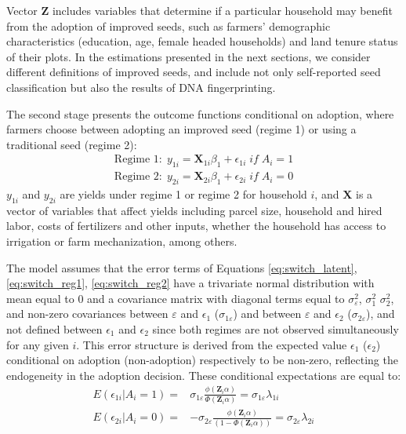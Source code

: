 \documentclass[11pt]{article}
\begin{document}
Vector $\bm{Z}$ includes variables that determine if a particular household may benefit from the adoption of improved seeds, such as farmers' demographic characteristics (education, age, female headed households) and land tenure status of their plots. In the estimations presented in the next sections, we consider different definitions of improved seeds, and include not only self-reported seed classification but also the results of DNA fingerprinting.  \par
The second stage presents the outcome functions conditional on adoption, where farmers choose between adopting an improved seed (regime 1) or using a traditional seed (regime 2):
\begin{align}
    \text{Regime 1}: \; y_{1i}=\bm{X}_{1i}\beta_1+ \epsilon_{1i} \; if \; A_i=1 \label{eq:switch_reg1}\\
     \text{Regime 2}: \; y_{2i}=\bm{X}_{2i}\beta_1+ \epsilon_{2i} \; if \; A_i=0 \label{eq:switch_reg2} 
\end{align}
$y_{1i}$ and $y_{2i}$ are yields under regime 1 or regime 2 for household $i$, and $\bm{X}$ is a vector of variables that affect yields including parcel size, household and hired labor, costs of fertilizers and other inputs, whether the household has access to irrigation or farm mechanization, among others.  \par
The model assumes that the error terms of Equations \ref{eq:switch_latent}, \ref{eq:switch_reg1}, \ref{eq:switch_reg2} have a trivariate normal distribution with mean equal to 0 and a covariance matrix with diagonal terms equal to $\sigma_{\varepsilon}^2$, $\sigma_1^2$ $\sigma_2^2$, and non-zero covariances between $\varepsilon$ and $\epsilon_1$ ($\sigma_{1\varepsilon}$) and between $\varepsilon$ and $\epsilon_2$ ($\sigma_{2\varepsilon}$), and not defined between $\epsilon_1$ and $\epsilon_2$ since both regimes are not observed simultaneously for any given $i$. This error structure is derived from the expected value $\epsilon_1$ ($\epsilon_2$) conditional on adoption  (non-adoption) respectively to be non-zero, reflecting the endogeneity in the adoption decision. These conditional expectations are equal to:
\begin{align*}
    E(\epsilon_{1i}|A_i=1)=&\sigma_{1\varepsilon}\frac{\phi(\bm{Z}_i\alpha)}{\Phi(\bm{Z}_i\alpha)}=\sigma_{1\varepsilon}\lambda_{1i} \\
    E(\epsilon_{2i}|A_i=0)=&-\sigma_{2\varepsilon}\frac{\phi(\bm{Z}_i\alpha)}{(1-\Phi(\bm{Z}_i\alpha))}=\sigma_{2\varepsilon}\lambda_{2i}
\end{align*}
\end{document}
